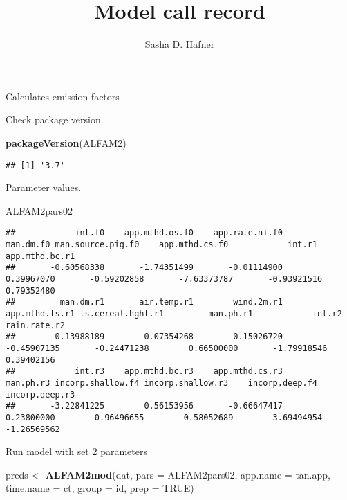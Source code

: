 \documentclass[
  landscape]{article}
\title{Model call record}
\author{Sasha D. Hafner}
\date{}
\newenvironment{Shaded}{\begin{snugshade}}{\end{snugshade}}
\newcommand{\AttributeTok}[1]{\textcolor[rgb]{0.13,0.29,0.53}{#1}}
\newcommand{\ConstantTok}[1]{\textcolor[rgb]{0.56,0.35,0.01}{#1}}
\newcommand{\FunctionTok}[1]{\textcolor[rgb]{0.13,0.29,0.53}{\textbf{#1}}}
\newcommand{\NormalTok}[1]{#1}
\newcommand{\OtherTok}[1]{\textcolor[rgb]{0.56,0.35,0.01}{#1}}
\newcommand{\StringTok}[1]{\textcolor[rgb]{0.31,0.60,0.02}{#1}}
\begin{document}
\maketitle

Calculates emission factors

Check package version.

\begin{Shaded}
\begin{Highlighting}[]
\FunctionTok{packageVersion}\NormalTok{(}\StringTok{\textquotesingle{}ALFAM2\textquotesingle{}}\NormalTok{)}
\end{Highlighting}
\end{Shaded}

\begin{verbatim}
## [1] '3.7'
\end{verbatim}

Parameter values.

\begin{Shaded}
\begin{Highlighting}[]
\NormalTok{ALFAM2pars02}
\end{Highlighting}
\end{Shaded}

\begin{verbatim}
##            int.f0    app.mthd.os.f0    app.rate.ni.f0         man.dm.f0 man.source.pig.f0    app.mthd.cs.f0            int.r1    app.mthd.bc.r1 
##       -0.60568338       -1.74351499       -0.01114900        0.39967070       -0.59202858       -7.63373787       -0.93921516        0.79352480 
##         man.dm.r1       air.temp.r1        wind.2m.r1    app.mthd.ts.r1 ts.cereal.hght.r1         man.ph.r1            int.r2      rain.rate.r2 
##       -0.13988189        0.07354268        0.15026720       -0.45907135       -0.24471238        0.66500000       -1.79918546        0.39402156 
##            int.r3    app.mthd.bc.r3    app.mthd.cs.r3         man.ph.r3 incorp.shallow.f4 incorp.shallow.r3    incorp.deep.f4    incorp.deep.r3 
##       -3.22841225        0.56153956       -0.66647417        0.23800000       -0.96496655       -0.58052689       -3.69494954       -1.26569562
\end{verbatim}

Run model with set 2 parameters

\begin{Shaded}
\begin{Highlighting}[]
\NormalTok{preds }\OtherTok{\textless{}{-}} \FunctionTok{ALFAM2mod}\NormalTok{(dat, }\AttributeTok{pars =}\NormalTok{ ALFAM2pars02, }\AttributeTok{app.name =} \StringTok{\textquotesingle{}tan.app\textquotesingle{}}\NormalTok{, }\AttributeTok{time.name =} \StringTok{\textquotesingle{}ct\textquotesingle{}}\NormalTok{, }\AttributeTok{group =} \StringTok{\textquotesingle{}id\textquotesingle{}}\NormalTok{, }\AttributeTok{prep =} \ConstantTok{TRUE}\NormalTok{)}
\end{Highlighting}
\end{Shaded}
\end{document}
